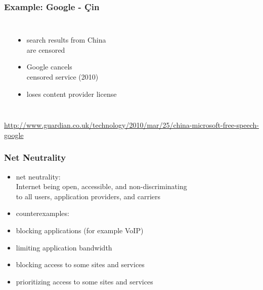 \documentclass[dvipsnames]{beamer}
\theoremstyle{plain}
\begin{document}
\begin{frame}
  \frametitle{Example: Google - Çin}

  \begin{columns}
    \begin{center}
    \end{center}

    \begin{itemize}
      \item search results from China\\
        are censored
      \item Google cancels\\
        censored service (2010)
      \item loses content provider license
    \end{itemize}
  \end{columns}

  \medskip
  \tiny{\url{http://www.guardian.co.uk/technology/2010/mar/25/china-microsoft-free-speech-google}}\\
\end{frame}

\begin{frame}
  \frametitle{Net Neutrality}

  \begin{itemize}
    \item \alert{net neutrality}:\\
      Internet being open, accessible, and non-discriminating\\
      to all users, application providers, and carriers

    \medskip
    \item counterexamples:
    \item blocking applications (for example VoIP)
    \item limiting application bandwidth
    \item blocking access to some sites and services
    \item prioritizing access to some sites and services
  \end{itemize}
\end{frame}
\end{document}
